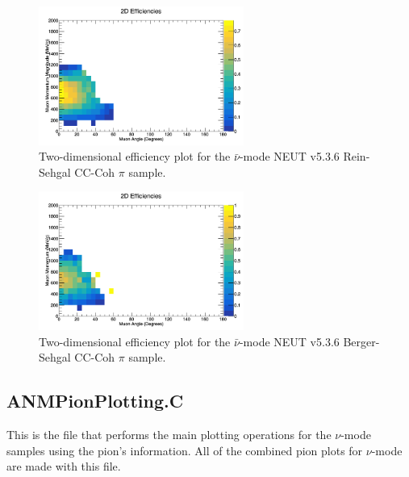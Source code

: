 \documentclass[11pt]{article}
\begin{document}
\begin{figure}[H]
\centering
\includegraphics[width=0.6\textwidth]{CCCohPlots/2DEffANMRS.png}
\caption{Two-dimensional efficiency plot for the $\bar{\nu}$-mode NEUT v5.3.6 Rein-Sehgal CC-Coh $\pi$ sample.}
\label{fig:app:ANMCCCohMuon2DEffRS}
\end{figure}

\begin{figure}[H]
\centering
\includegraphics[width=0.6\textwidth]{CCCohPlots/2DEffANMBS.png}
\caption{Two-dimensional efficiency plot for the $\bar{\nu}$-mode NEUT v5.3.6 Berger-Sehgal CC-Coh $\pi$ sample.}
\label{fig:app:ANMCCCohMuon2DEffBS}
\end{figure}

\subsection{ANMPionPlotting.C}
\label{sub:ANMPionPlotting.C}
This is the file that performs the main plotting operations for the $\nu$-mode samples using the pion's information. All of the combined pion plots for $\nu$-mode are made with this file.
\end{document}
